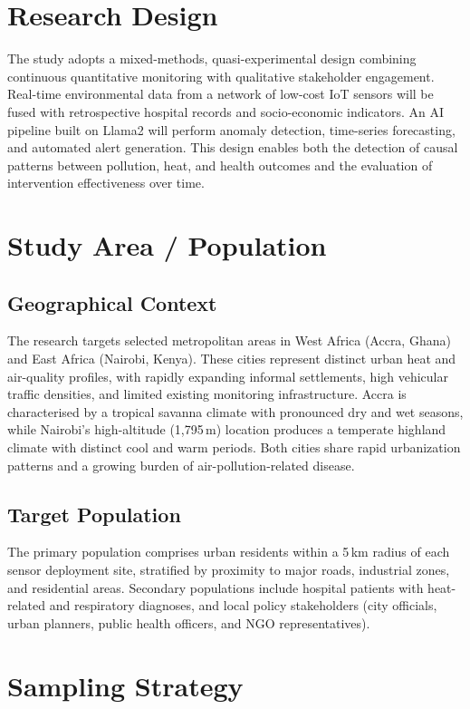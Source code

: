 \section{Research Design}
The study adopts a mixed-methods, quasi-experimental design combining continuous quantitative monitoring with qualitative stakeholder engagement. Real-time environmental data from a network of low-cost IoT sensors will be fused with retrospective hospital records and socio-economic indicators. An AI pipeline built on Llama2 will perform anomaly detection, time-series forecasting, and automated alert generation. This design enables both the detection of causal patterns between pollution, heat, and health outcomes and the evaluation of intervention effectiveness over time.

\section{Study Area / Population}

\subsection{Geographical Context}
The research targets selected metropolitan areas in West Africa (Accra, Ghana) and East Africa (Nairobi, Kenya). These cities represent distinct urban heat and air-quality profiles, with rapidly expanding informal settlements, high vehicular traffic densities, and limited existing monitoring infrastructure. Accra is characterised by a tropical savanna climate with pronounced dry and wet seasons, while Nairobi's high-altitude (1,795\,m) location produces a temperate highland climate with distinct cool and warm periods. Both cities share rapid urbanization patterns and a growing burden of air-pollution-related disease.

\subsection{Target Population}
The primary population comprises urban residents within a 5\,km radius of each sensor deployment site, stratified by proximity to major roads, industrial zones, and residential areas. Secondary populations include hospital patients with heat-related and respiratory diagnoses, and local policy stakeholders (city officials, urban planners, public health officers, and NGO representatives).

\section{Sampling Strategy}


